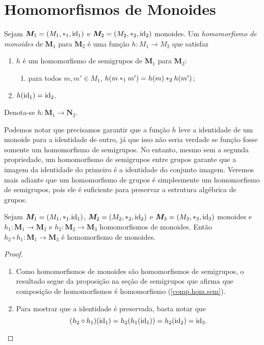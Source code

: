 \section{Homomorfismos de Monoides}

\begin{defi}
Sejam $\bm M_1=(M_1,\ast_1,\mathrm{id}_1)$ e $\bm M_2=(M_2,\ast_2,\mathrm{id}_2)$ monoides. Um \emph{homomorfismo de monoides} de $\bm M_1$ para $\bm M_2$ é uma função $h: M_1 \to M_2$ que satisfaz
	\begin{enumerate}
	\item $h$ é um homomorfismo de semigrupos de $\bm M_1$ para $\bm M_2$:
		\begin{enumerate}
		\item para todos $m,m' \in M_1$, $h(m \ast_1 m')=h(m) \ast_2 h(m')$;
		\end{enumerate}
	\item $h(\mathrm{id}_1)=\mathrm{id}_2$.
	\end{enumerate}
\noindent Denota-se $h: \bm M_1 \to \bm N_2$. %
\end{defi}

Podemos notar que precisamos garantir que a função $h$ leve a identidade de um monoide para a identidade de outro, já que isso não seria verdade se função fosse somente um homomorfismo de semigrupos. No entanto, mesmo sem a segunda propriedade, um homomorfismo de semigrupos entre grupos garante que a imagem da identidade do primeiro é a identidade do conjunto imagem. Veremos mais adiante que um homomorfismo de grupos é simplesmente um homomorfismo de semigrupos, pois ele é suficiente para preservar a estrutura algébrica de grupos.

\begin{prop}
\label{comp.hom.mon}
Sejam $\bm M_1=(M_1,\ast_1.\mathrm{id}_1)$, $\bm M_2=(M_2,\ast_2,\mathrm{id}_2)$ e $\bm M_3=(M_3,\ast_3,\mathrm{id}_3)$ monoides e $h_1: \bm M_1 \to \bm M_2$ e $h_2: \bm M_2 \to \bm M_3$ homomorfismos de monoides. Então $h_2 \circ h_1: \bm M_1 \to \bm M_3$ é homomorfismo de monoides.
\end{prop}
\begin{proof}
	\begin{enumerate}
	\item Como homomorfismos de monoides são homomorfismos de semigrupos, o resultado segue da proposição na seção de semigrupos que afirma que composição de homomorfismos é homomorfismo (\ref{comp.hom.sem}).
	\item Para mostrar que a identidade é preservada, basta notar que
	\begin{equation*}
	(h_2 \circ h_1)(\mathrm{id}_1) = h_2(h_1(\mathrm{id}_1)) = h_2(\mathrm{id}_2) = \mathrm{id}_3.
	\end{equation*}
	\end{enumerate}
\end{proof}


